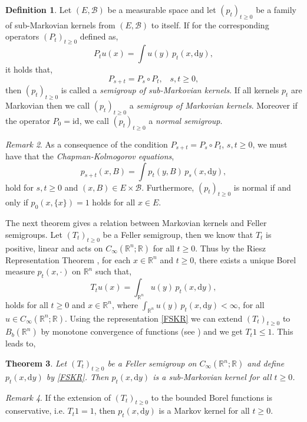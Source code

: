 \documentclass[a4paper, 12pt]{report}
\newtheorem{theorem}{Theorem}[section]
\theoremstyle{remark}
\newtheorem{remark}[theorem]{Remark}
\theoremstyle{definition}
\newtheorem{definition}[theorem]{Definition}
\begin{document}
\begin{definition}
Let $(E, \mathcal{B})$ be a measurable space and let $(p_t)_{t \ge 0}$ be a family of sub-Markovian kernels from $(E, \mathcal{B})$ to itself.  If for the corresponding operators $(P_t)_{t \ge 0}$ defined as,
$$
P_tu(x) = \int u(y)\,p_t(x, \mathrm{d}y),
$$
it holds that,
$$
P_{s + t} = P_s\circ P_t, \,\,\,\,\, s, t \ge 0,
$$
then $(p_t)_{t \ge 0}$ is called a \emph{semigroup of sub-Markovian kernels}.  If all kernels $p_t$ are Markovian then we call $(p_t)_{t \ge 0}$ a \emph{semigroup of Markovian kernels}.  Moreover if the operator $P_0 = \mathrm{id}$, we call $(p_t)_{t \ge 0}$ a \emph{normal semigroup}.
\end{definition}
\begin{remark}
As a consequence of the condition $P_{s + t} = P_s \circ P_t$, $s, t \ge 0$, we must have that the \emph{Chapman-Kolmogorov equations},
\begin{equation}
p_{s + t}(x, B) = \int p_t(y, B)\,p_s(x, \mathrm{d}y),
\end{equation}
hold for $s, t \ge 0$ and $(x, B) \in E \times \mathcal{B}$.  Furthermore, $(p_t)_{t \ge 0}$ is normal if and only if $p_0(x, \{x\}) = 1$ holds for all $x \in E$.
\end{remark}
The next theorem gives a relation between Markovian kernels and Feller semigroups.  Let $(T_t)_{t \ge 0}$ be a Feller semigroup, then we know that $T_t$ is positive, linear and acts on $C_\infty(\mathbb{R}^n; \mathbb{R})$ for all $t \ge 0$.  Thus by the Riesz Representation Theorem \cite[Theorem 2.3.4]{Vol1}, for each $x \in \mathbb{R}^n$ and $t \ge 0$, there exists a unique Borel measure $p_t(x, \cdot)$ on $\mathbb{R}^n$ such that,
\begin{equation}\label{FSKR}
T_tu(x) = \int_{\mathbb{R}^n}u(y)\,p_t(x, \mathrm{d}y),
\end{equation}
holds for all $t \ge 0$ and $x \in \mathbb{R}^n$, where $\int_{\mathbb{R}^n}u(y)\,p_t(x, \mathrm{d}y) < \infty$, for all $u \in C_\infty(\mathbb{R}^n; \mathbb{R})$.  Using the representation \eqref{FSKR} we can extend $(T_t)_{t \ge 0}$ to $B_b(\mathbb{R}^n)$ by monotone convergence of functions (see \cite{Vol1}) and we get $T_t1 \le 1$.  This leads to,

\begin{theorem}
Let $(T_t)_{t \ge 0}$ be a Feller semigroup on $C_\infty(\mathbb{R}^n; \mathbb{R})$ and define $p_t(x, \mathrm{d}y)$ by \eqref{FSKR}.  Then $p_t(x, \mathrm{d}y)$ is a sub-Markovian kernel for all $t \ge 0$.
\end{theorem}
\begin{remark}
If the extension of $(T_t)_{t \ge 0}$ to the bounded Borel functions is conservative, i.e. $T_t1 = 1$, then $p_t(x, \mathrm{d}y)$ is a Markov kernel for all $t \ge 0$.
\end{remark}
\end{document}
